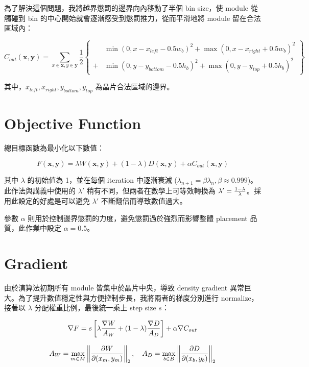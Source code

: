 \documentclass[12pt]{article}
\begin{document}
為了解決這個問題，我將越界懲罰的邊界向內移動了半個 bin size，使 module 從觸碰到 bin 的中心開始就會逐漸感受到懲罰推力，從而平滑地將 module 留在合法區域內：

$$C_{out}(\mathbf x, \mathbf y) = \sum_{x \in \mathbf x, y \in \mathbf y}\frac12\left\{\begin{aligned} 
&\min\left(0, x - x_{left} - 0.5 w_b\right)^2 + \max\left(0, x - x_{right} + 0.5 w_b\right)^2 \\ 
+&\min\left(0, y - y_{bottom} - 0.5 h_b\right)^2 + \max\left(0, y - y_{top} + 0.5 h_b\right)^2 
\end{aligned}\right\}$$

其中，$x_{left}, x_{right}, y_{bottom}, y_{top}$ 為晶片合法區域的邊界。

\section{Objective Function}

總目標函數為最小化以下數值：

$$F(\mathbf x, \mathbf y) = \lambda W(\mathbf x, \mathbf y) + (1 - \lambda) D(\mathbf x, \mathbf y) + \alpha C_{out}(\mathbf x, \mathbf y)$$

其中 $\lambda$ 的初始值為 1，並在每個 iteration 中逐漸衰減 ($\lambda_{n+1} = \beta \lambda_{n}, \beta \approx 0.999$)。此作法與講義中使用的 $\lambda'$ 稍有不同，但兩者在數學上可等效轉換為 $\lambda' = {1 - \lambda \over \lambda}$。採用此設定的好處是可以避免 $\lambda'$ 不斷翻倍而導致數值過大。

參數 $\alpha$ 則用於控制邊界懲罰的力度，避免懲罰過於強烈而影響整體 placement 品質，此作業中設定 $\alpha = 0.5$。

\section{Gradient}

由於演算法初期所有 module 皆集中於晶片中央，導致 density gradient 異常巨大。為了提升數值穩定性與方便控制步長，我將兩者的梯度分別進行 normalize，接著以 $\lambda$ 分配權重比例，最後統一乘上 step size $s$：

$$\nabla F = s \left[\lambda {\nabla W \over A_W} + (1 - \lambda) {\nabla D \over A_D}\right] + \alpha \nabla C_{out}$$

$$A_W = \max\limits_{m \in M} \left\lVert {\partial W \over \partial (x_m, y_m)} \right\rVert_2, \quad A_D = \max\limits_{b \in B} \left\lVert {\partial D \over \partial (x_b, y_b)} \right\rVert_2$$
\end{document}
